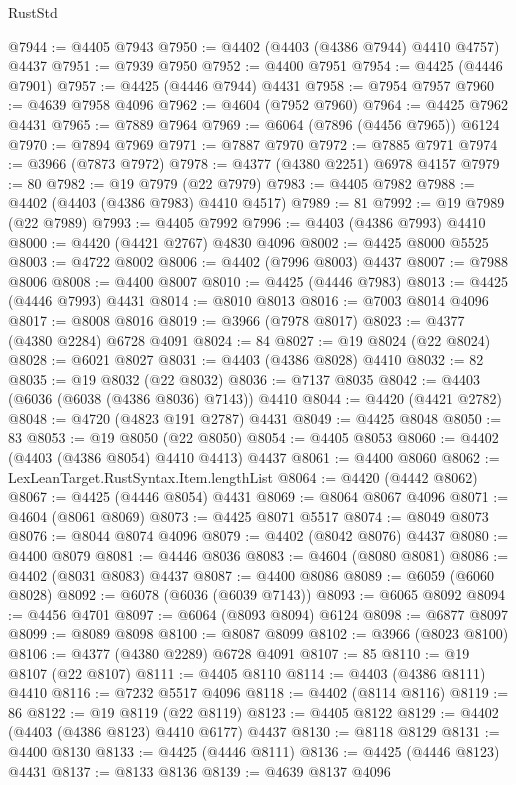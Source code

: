 \begin{lexlean}{RustStd}
\begin{coremodule}
@7944 := @4405 @7943
@7950 := @4402 (@4403 (@4386 @7944) @4410 @4757) @4437
@7951 := @7939 @7950
@7952 := @4400 @7951
@7954 := @4425 (@4446 @7901)
@7957 := @4425 (@4446 @7944) @4431
@7958 := @7954 @7957
@7960 := @4639 @7958 @4096
@7962 := @4604 (@7952 @7960)
@7964 := @4425 @7962 @4431
@7965 := @7889 @7964
@7969 := @6064 (@7896 (@4456 @7965)) @6124
@7970 := @7894 @7969
@7971 := @7887 @7970
@7972 := @7885 @7971
@7974 := @3966 (@7873 @7972)
@7978 := @4377 (@4380 @2251) @6978 @4157
@7979 := 80
@7982 := @19 @7979 (@22 @7979)
@7983 := @4405 @7982
@7988 := @4402 (@4403 (@4386 @7983) @4410 @4517)
@7989 := 81
@7992 := @19 @7989 (@22 @7989)
@7993 := @4405 @7992
@7996 := @4403 (@4386 @7993) @4410
@8000 := @4420 (@4421 @2767) @4830 @4096
@8002 := @4425 @8000 @5525
@8003 := @4722 @8002
@8006 := @4402 (@7996 @8003) @4437
@8007 := @7988 @8006
@8008 := @4400 @8007
@8010 := @4425 (@4446 @7983)
@8013 := @4425 (@4446 @7993) @4431
@8014 := @8010 @8013
@8016 := @7003 @8014 @4096
@8017 := @8008 @8016
@8019 := @3966 (@7978 @8017)
@8023 := @4377 (@4380 @2284) @6728 @4091
@8024 := 84
@8027 := @19 @8024 (@22 @8024)
@8028 := @6021 @8027
@8031 := @4403 (@4386 @8028) @4410
@8032 := 82
@8035 := @19 @8032 (@22 @8032)
@8036 := @7137 @8035
@8042 := @4403 (@6036 (@6038 (@4386 @8036) @7143)) @4410
@8044 := @4420 (@4421 @2782)
@8048 := @4720 (@4823 @191 @2787) @4431
@8049 := @4425 @8048
@8050 := 83
@8053 := @19 @8050 (@22 @8050)
@8054 := @4405 @8053
@8060 := @4402 (@4403 (@4386 @8054) @4410 @4413) @4437
@8061 := @4400 @8060
@8062 := LexLeanTarget.RustSyntax.Item.lengthList
@8064 := @4420 (@4442 @8062)
@8067 := @4425 (@4446 @8054) @4431
@8069 := @8064 @8067 @4096
@8071 := @4604 (@8061 @8069)
@8073 := @4425 @8071 @5517
@8074 := @8049 @8073
@8076 := @8044 @8074 @4096
@8079 := @4402 (@8042 @8076) @4437
@8080 := @4400 @8079
@8081 := @4446 @8036
@8083 := @4604 (@8080 @8081)
@8086 := @4402 (@8031 @8083) @4437
@8087 := @4400 @8086
@8089 := @6059 (@6060 @8028)
@8092 := @6078 (@6036 (@6039 @7143))
@8093 := @6065 @8092
@8094 := @4456 @4701
@8097 := @6064 (@8093 @8094) @6124
@8098 := @6877 @8097
@8099 := @8089 @8098
@8100 := @8087 @8099
@8102 := @3966 (@8023 @8100)
@8106 := @4377 (@4380 @2289) @6728 @4091
@8107 := 85
@8110 := @19 @8107 (@22 @8107)
@8111 := @4405 @8110
@8114 := @4403 (@4386 @8111) @4410
@8116 := @7232 @5517 @4096
@8118 := @4402 (@8114 @8116)
@8119 := 86
@8122 := @19 @8119 (@22 @8119)
@8123 := @4405 @8122
@8129 := @4402 (@4403 (@4386 @8123) @4410 @6177) @4437
@8130 := @8118 @8129
@8131 := @4400 @8130
@8133 := @4425 (@4446 @8111)
@8136 := @4425 (@4446 @8123) @4431
@8137 := @8133 @8136
@8139 := @4639 @8137 @4096

\end{coremodule}
\end{lexlean}
